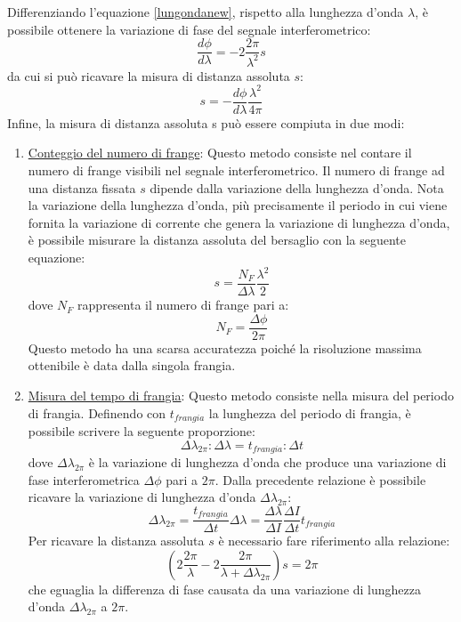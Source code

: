 Differenziando l'equazione \ref{lungondanew}, rispetto alla lunghezza d'onda $\lambda$, è possibile ottenere la variazione di fase del segnale interferometrico:
\begin{equation}
	\frac{d\phi}{d\lambda}=-2\frac{2\pi}{\lambda^2}s
\end{equation}
da cui si può ricavare la misura di distanza assoluta $s$:
\begin{equation}
	s=-\frac{d\phi}{d\lambda}\frac{\lambda^2}{4\pi}
\end{equation}
Infine, la misura di distanza assoluta s può essere compiuta in due modi:
\begin{enumerate}
	\item \underline{Conteggio del numero di frange}: Questo metodo consiste nel contare il numero di frange visibili nel segnale interferometrico. Il numero di frange ad una distanza fissata $s$ dipende dalla variazione della lunghezza d'onda. Nota la variazione della lunghezza d'onda, più precisamente il periodo in cui viene fornita la variazione di corrente che genera la variazione di lunghezza d'onda, è possibile misurare la distanza assoluta del bersaglio con la seguente equazione:
	\begin{equation}
		s=\frac{N_F}{\Delta \lambda}\frac{\lambda^2}{2}
	\end{equation}
	dove $N_F$ rappresenta il numero di frange pari a:
	\begin{equation}
		N_F=\frac{\Delta \phi}{2 \pi}
	\end{equation}
	Questo metodo ha una scarsa accuratezza poiché la risoluzione massima ottenibile è data dalla singola frangia. 
	\item \underline{Misura del tempo di frangia}: Questo metodo consiste nella misura del periodo di frangia. Definendo con $t_{frangia}$ la lunghezza del periodo di frangia, è possibile scrivere la seguente proporzione:
	\begin{equation}
		\Delta \lambda_{2\pi} : \Delta \lambda = t_{frangia} : \Delta t
	\end{equation}
dove $\Delta \lambda_{2\pi}$ è la variazione di lunghezza d'onda che produce una variazione di fase interferometrica $\Delta \phi$ pari a $2\pi$.
Dalla precedente relazione è possibile ricavare la variazione di lunghezza d'onda $\Delta \lambda_{2\pi}$:
	\begin{equation}
		\Delta \lambda_{2\pi} = \frac{t_{frangia}}{\Delta t} \Delta \lambda = \frac{\Delta \lambda}{\Delta I}\frac{\Delta I}{\Delta t} t_{frangia}
	\end{equation}
	Per ricavare la distanza assoluta $s$ è necessario fare riferimento alla relazione:
	\begin{equation}
		\left ( 2\frac{2\pi}{\lambda}-2\frac{2\pi}{\lambda + \Delta \lambda_{2\pi}} \right ) s = 2\pi
	\end{equation}
	che eguaglia la differenza di fase causata da una variazione di lunghezza d'onda $\Delta \lambda_{2\pi}$ a $2\pi$.
	

\end{enumerate}
